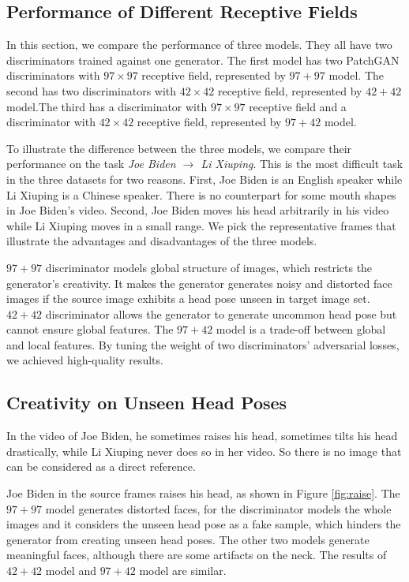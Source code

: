 \documentclass[letterpaper]{article} %
\newcommand{\zhiming}[1]{{\bf \color{blue} [Zhiming says: #1]}}
\begin{document}
	\subsection{Performance of Different Receptive Fields}
	In this section, we compare the performance of three models. They all have two discriminators trained against one generator. The first model has two PatchGAN discriminators with $97\times97$ receptive field, represented by $97+97$ model. The second has two discriminators with $42\times42$ receptive field, represented by $42+42$ model.The third has a discriminator with $97\times97$ receptive field and a discriminator with $42\times42$ receptive field, represented by $97+42$ model. 
	
	To illustrate the difference between the three models, we compare their performance on the task \emph{Joe Biden $\rightarrow$ Li Xiuping}. This is the most difficult task in the three datasets for two reasons. First, Joe Biden is an English speaker while Li Xiuping is a Chinese speaker. There is no counterpart for some mouth shapes in Joe Biden's video. Second, Joe Biden moves his head arbitrarily in his video while Li Xiuping moves in a small range. We pick the representative frames that illustrate the advantages and disadvantages of the three models. 
	
	$97+97$ discriminator models global structure of images, which restricts the generator's creativity. It makes the generator generates noisy and distorted face images if the source image exhibits a head pose unseen in target image set. %
	$42+42$ discriminator allows the generator to generate uncommon head pose but cannot ensure global features. The $97+42$ model is a trade-off between global and local features. By tuning the weight of two discriminators' adversarial losses, we achieved high-quality results. 
	
	\subsection{Creativity on Unseen Head Poses}
	In the video of Joe Biden, he sometimes raises his head, sometimes tilts his head drastically,  while Li Xiuping never does so in her video. So there is no image that can be considered as a direct reference. 
	
	Joe Biden in the source frames raises his head, as shown in Figure \ref{fig:raise}. The $97+97$ model generates distorted faces, for the discriminator models the whole images and it considers the unseen head pose as a fake sample, which hinders the generator from creating unseen head poses. The other two models generate meaningful faces, although there are some artifacts on the neck. The results of $42+42$ model and $97+42$ model are similar.
	
\end{document}
